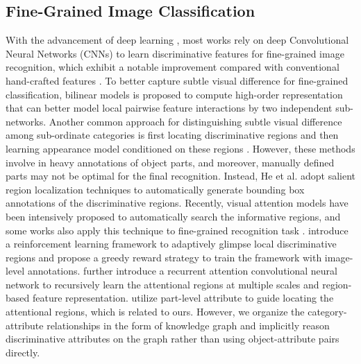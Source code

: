 \documentclass{article}
\begin{document}
\subsection{Fine-Grained Image Classification}
With the advancement of deep learning \cite{he2016deep,simonyan2014very}, most works rely on deep Convolutional Neural Networks (CNNs) to learn discriminative features for fine-grained image recognition, which exhibit a notable improvement compared with conventional hand-crafted features \cite{he2017weakly,lin2015bilinear}. To better capture subtle visual difference for fine-grained classification, bilinear models \cite{lin2015bilinear,gao2016compact,kong2017low} is proposed to compute high-order representation that can better model local pairwise feature interactions by two independent sub-networks. Another common approach for distinguishing subtle visual difference among sub-ordinate categories is first locating discriminative regions and then learning appearance model conditioned on these regions \cite{zhang2014part,huang2016part}. However, these methods involve in heavy annotations of object parts, and moreover, manually defined parts may not be optimal for the final recognition. Instead, He et al. \cite{he2017fine} adopt salient region localization techniques \cite{chen2016disc,zhou2016learning} to automatically generate bounding box annotations of the discriminative regions. Recently, visual attention models \cite{mnih2014recurrent,wang2017multi,chen2018recurrent,liu2018crowd} have been intensively proposed to automatically search the informative regions, and some works also apply this technique to fine-grained recognition task \cite{liu2016fully,zheng2017learning,peng2018object}. \cite{liu2016fully} introduce a reinforcement learning framework to adaptively glimpse local discriminative regions and propose a greedy reward strategy to train the framework with image-level annotations. \cite{fu2017look} further introduce a recurrent attention convolutional neural network to recursively learn the attentional regions at multiple scales and region-based feature representation. \cite{liu2017localizing} utilize part-level attribute to guide locating the attentional regions, which is related to ours. However, we organize the category-attribute relationships in the form of knowledge graph and implicitly reason discriminative attributes on the graph rather than using object-attribute pairs directly.

 
\end{document}
